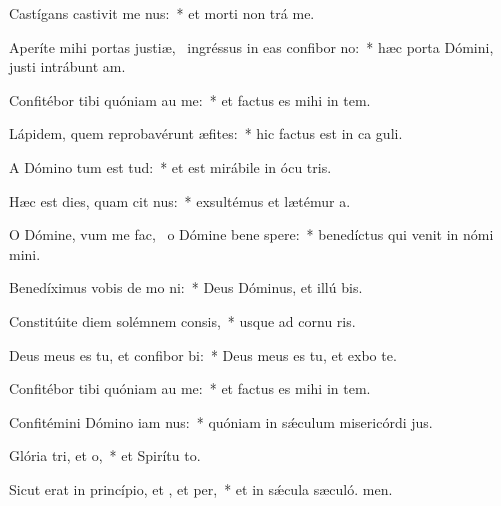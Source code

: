 \item Castígans castivit me nus:~* et morti non trá me.
\item Aperíte mihi portas justiæ,~\pscross{} ingréssus in eas confibor no:~* hæc porta Dómini, justi intrábunt  am.
\item Confitébor tibi quóniam au me:~* et factus es mihi in tem.
\item Lápidem, quem reprobavérunt æfites:~* hic factus est in ca guli.
\item A Dómino tum est tud:~* et est mirábile in ócu tris.
\item Hæc est dies, quam cit nus:~* exsultémus et lætémur  a.
\item O Dómine, vum me fac,~\pscross{} o Dómine bene spere:~* benedíctus qui venit in nómi mini.
\item Benedíximus vobis de mo ni:~* Deus Dóminus, et illú bis.
\item Constitúite diem solémnem  consis,~* usque ad cornu ris.
\item Deus meus es tu, et confibor bi:~* Deus meus es tu, et exbo te.
\item Confitébor tibi quóniam au me:~* et factus es mihi in tem.
\item Confitémini Dómino iam nus:~* quóniam in sǽculum misericórdi jus.
\item Glória tri, et o,~* et Spirítu to.
\item Sicut erat in princípio, et , et per,~* et in sǽcula sæculó. men.
